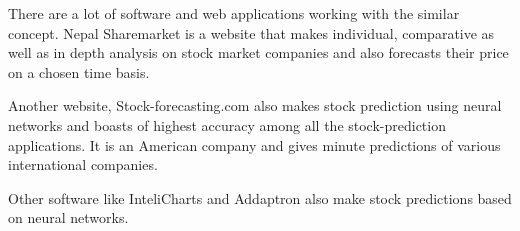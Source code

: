 There are a lot of software and web applications working with the similar concept. Nepal Sharemarket is a website that makes individual, comparative as well as in depth analysis on stock market companies and also forecasts their price on a chosen time basis.

Another website, Stock-forecasting.com also makes stock prediction using neural networks and boasts of highest accuracy among all the stock-prediction applications. It is an American company and gives minute predictions of various international companies.

Other software like InteliCharts and Addaptron also make stock predictions based on neural networks.